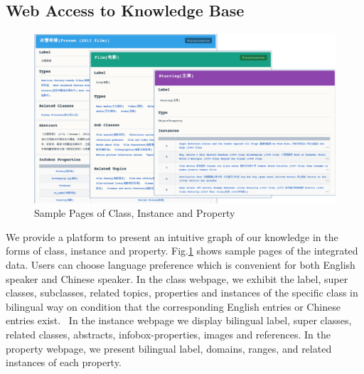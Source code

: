 \documentclass[runningheads,a4paper]{llncs}
\begin{document}
\subsection{Web Access to Knowledge Base}

\begin{figure}[ht]
    \centerline{\includegraphics[width=1\columnwidth]{fig/xlore}}
    \caption{Sample Pages of Class, Instance and Property}
    \label{fig:xlore}
\end{figure}

We provide a platform to present an intuitive graph of our knowledge in the forms of class, instance and property. Fig.\ref{fig:xlore} shows sample pages of the integrated data. Users can choose language preference which is convenient for both English speaker and Chinese speaker. In the class webpage, we exhibit the label, super classes, subclasses, related topics, properties and instances of the specific class in bilingual way on condition that the corresponding English entries or Chinese entries exist.  In the instance webpage we display bilingual label, super classes, related classes, abstracts, infobox-properties, images and references. In the property webpage, we present bilingual label, domains, ranges, and related instances of each property.
\end{document}
